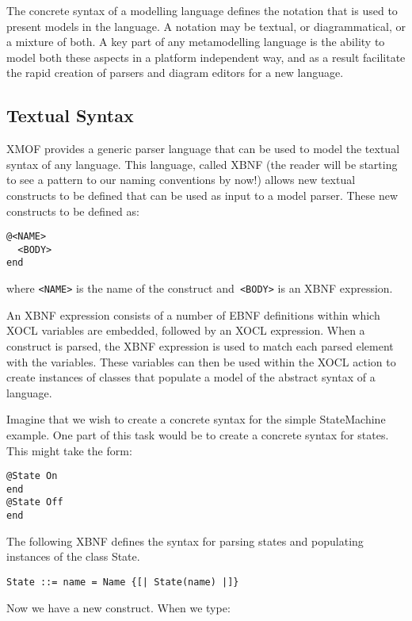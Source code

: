 The concrete syntax of a modelling language defines the notation
that is used to present models in the language. A notation may be
textual, or diagrammatical, or a mixture of both. A key part of
any metamodelling language is the ability to model both these
aspects in a platform independent way, and as a result facilitate
the rapid creation of parsers and diagram editors for a new
language.

\subsection{Textual Syntax}

XMOF provides a generic parser language that can be used to model
the textual syntax of any language. This language, called XBNF
(the reader will be starting to see a pattern to our naming
conventions by now!) allows new textual constructs to be defined
that can be used as input to a model parser. These new constructs
to be defined as:

\small
\begin{verbatim}
@<NAME>
  <BODY>
end
\end{verbatim}
\normalsize

\noindent where {\tt <NAME>} is the name of the construct and{\tt
<BODY>} is an XBNF expression.

An XBNF expression consists of a number of EBNF definitions within
which XOCL variables are embedded, followed by an XOCL expression.
When a construct is parsed, the XBNF expression is used to match
each parsed element with the variables. These variables can then
be used within the XOCL action to create instances of classes that
populate a model of the abstract syntax of a language.

Imagine that we wish to create a concrete syntax for the simple
StateMachine example. One part of this task would be to create a
concrete syntax for states. This might take the form:

\small
\begin{verbatim}
@State On
end
@State Off
end
\end{verbatim}
\normalsize

The following XBNF defines the syntax for parsing states and
populating instances of the class State.

\small
\begin{verbatim}
State ::= name = Name {[| State(name) |]}
\end{verbatim}
\normalsize

\noindent Now we have a new construct. When we type:

